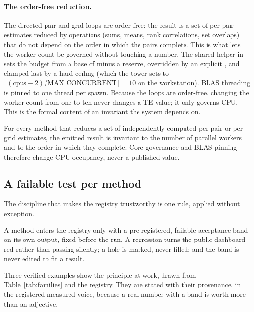 \paragraph{The order-free reduction.}
The directed-pair and grid loops are order-free: the result is a set of per-pair
estimates reduced by operations (sums, means, rank correlations, set overlaps) that do
not depend on the order in which the pairs complete. This is what lets the worker
count be governed without touching a number. The shared helper
 in  sets the  budget from a base of
 minus a reserve, overridden by an explicit , and
clamped last by a hard ceiling  (which the tower sets to
$\lfloor(\text{cpus}-2)/\text{MAX\_CONCURRENT}\rfloor=10$ on the workstation). BLAS
threading is pinned to one thread per spawn. Because the loops are order-free, changing
the worker count from one to ten never changes a TE value; it only governs CPU. This is
the formal content of an invariant the system depends on.

\begin{invariant}
\label{inv:order-free}
For every method that reduces a set of independently computed per-pair or per-grid
estimates, the emitted result is invariant to the number of parallel workers and to the
order in which they complete. Core governance and BLAS pinning therefore change CPU
occupancy, never a published value.
\end{invariant}

\subsection{A failable test per method}
\label{sec:failable}

The discipline that makes the registry trustworthy is one rule, applied without
exception.

\begin{principle}
\label{prin:failable}
A method enters the registry only with a pre-registered, failable acceptance band on
its own output, fixed before the run. A regression turns the public dashboard red
rather than passing silently; a hole is marked, never filled; and the band is never
edited to fit a result.
\end{principle}

Three verified examples show the principle at work, drawn from
Table~\ref{tab:families} and the registry. They are stated with their provenance, in
the registered measured voice, because a real number with a band is worth more than an
adjective.

